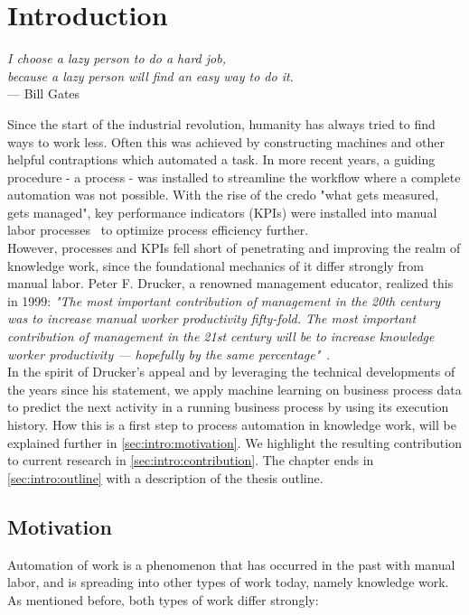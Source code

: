 \chapter{Introduction}\label{sec:intro}
\begin{flushright}{\slshape
I choose a lazy person to do a hard job,\\
because a lazy person will find an easy way to do it.}\\
\medskip
--- Bill Gates
\end{flushright}

\noindent Since the start of the industrial revolution, humanity has always tried to find ways to work less. Often this was achieved by constructing machines and other helpful contraptions which automated a task. In more recent years, a guiding procedure - a process - was installed to streamline the workflow where a complete automation was not possible. With the rise of the credo "what gets measured, gets managed", key performance indicators (KPIs) were installed into manual labor processes~\cite{web:taylorism-and-drucker} to optimize process efficiency further.\\

However, processes and KPIs fell short of penetrating and improving the realm of knowledge work, since the foundational mechanics of it differ strongly from manual labor. Peter F. Drucker, a renowned management educator, realized this in 1999:
{\slshape"The most important contribution of management in the 20th century was to increase manual worker productivity fifty-fold. The most important contribution of management in the 21st century will be to increase knowledge worker productivity — hopefully by the same percentage"}~\cite{drucker1999}.\\

In the spirit of Drucker's appeal and by leveraging the technical developments of the years since his statement, we apply machine learning on business process data to predict the next activity in a running business process by using its execution history. How this is a first step to process automation in knowledge work, will be explained further in \autoref{sec:intro:motivation}.  We highlight the resulting contribution to current research in \autoref{sec:intro:contribution}. The chapter ends in \autoref{sec:intro:outline} with a description of the thesis outline.

\section{Motivation} \label{sec:intro:motivation}
Automation of work is a phenomenon that has occurred in the past with manual labor, and is spreading into other types of work today, namely knowledge work. As mentioned before, both types of work differ strongly:

